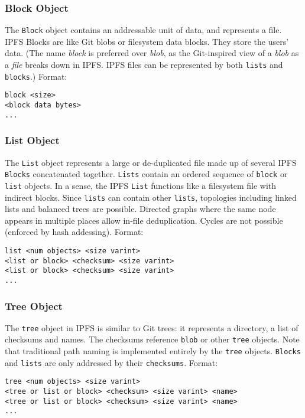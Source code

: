 \documentclass{sig-alternate}
\begin{document}
\subsubsection{Block Object}

The \texttt{Block} object contains an addressable unit of data, and
represents a file.
IPFS Blocks are like Git blobs or filesystem data blocks. They store the
users' data. (The name \textit{block} is preferred over \textit{blob}, as the
Git-inspired view of a \textit{blob} as a \textit{file} breaks down in IPFS.
IPFS files can be represented by both \texttt{lists} and \texttt{blocks}.)
Format:
\begin{verbatim}
block <size>
<block data bytes>
...
\end{verbatim}


\subsubsection{List Object}

The \texttt{List} object represents a large or de-duplicated file made up of
several IPFS \texttt{Blocks} concatenated together. \texttt{Lists} contain
an ordered sequence of \texttt{block} or \texttt{list} objects.
In a sense, the IPFS \texttt{List} functions like a filesystem file with
indirect blocks. Since \texttt{lists} can contain other \texttt{lists}, topologies including linked lists and balanced trees are possible. Directed graphs where the same node appears in multiple places allow in-file deduplication. Cycles are not possible (enforced by hash addessing).
Format:
\begin{verbatim}
list <num objects> <size varint>
<list or block> <checksum> <size varint>
<list or block> <checksum> <size varint>
...
\end{verbatim}


\subsubsection{Tree Object}

The \texttt{tree} object in IPFS is similar to Git trees: it represents a
directory, a list of checksums and names. The checksums reference \texttt{blob}
or other \texttt{tree} objects. Note that traditional path naming
is implemented entirely by the \texttt{tree} objects. \texttt{Blocks} and
\texttt{lists} are only addressed by their \texttt{checksums}.
Format:
\begin{verbatim}
tree <num objects> <size varint>
<tree or list or block> <checksum> <size varint> <name>
<tree or list or block> <checksum> <size varint> <name>
...
\end{verbatim}
\end{document}
